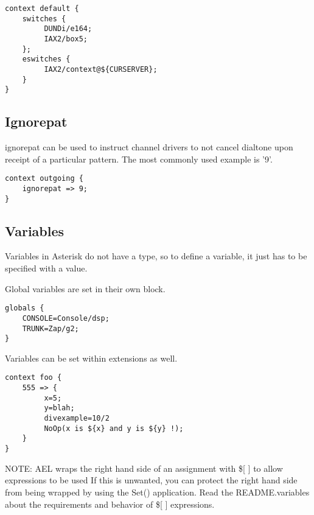 {\begin{astlisting}
\begin{verbatim}
context default {
    switches {
         DUNDi/e164;
         IAX2/box5;
    };
    eswitches {
         IAX2/context@${CURSERVER};
    }
}
\end{verbatim}
\end{astlisting}

\subsection{Ignorepat}

ignorepat can be used to instruct channel drivers to not cancel
dialtone upon receipt of a particular pattern. The most commonly used
example is '9'.
\begin{astlisting}
\begin{verbatim}
context outgoing {
    ignorepat => 9;
}
\end{verbatim}
\end{astlisting}

\subsection{Variables}

Variables in Asterisk do not have a type, so to define a variable, it
just has to be specified with a value.

Global variables are set in their own block.

\begin{astlisting}
\begin{verbatim}
globals {
    CONSOLE=Console/dsp;
    TRUNK=Zap/g2;
}
\end{verbatim}
\end{astlisting}

Variables can be set within extensions as well.

\begin{astlisting}
\begin{verbatim}
context foo {
    555 => {
         x=5;
         y=blah;
         divexample=10/2
         NoOp(x is ${x} and y is ${y} !);
    }
}
\end{verbatim}
\end{astlisting}

NOTE: AEL wraps the right hand side of an assignment with \$[ ] to allow
expressions to be used If this is unwanted, you can protect the right hand
side from being wrapped by using the Set() application.
Read the README.variables about the requirements and behavior
of \$[ ] expressions.

}
